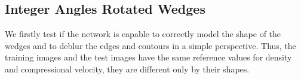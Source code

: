 \documentclass[conference,compsoc]{IEEEtran}
\begin{document}
\subsection{Integer Angles Rotated Wedges} \label{IARW}
We firstly test if the network is capable to correctly model the shape of the wedges
and to deblur the edges and contours in a simple perspective.
Thus, the training images and the test images have the same reference values for density and compressional velocity,
they are different only by their shapes.
\begin{figure}[!t]
\centering
{}
\hfil
{}
\end{figure}
\end{document}
